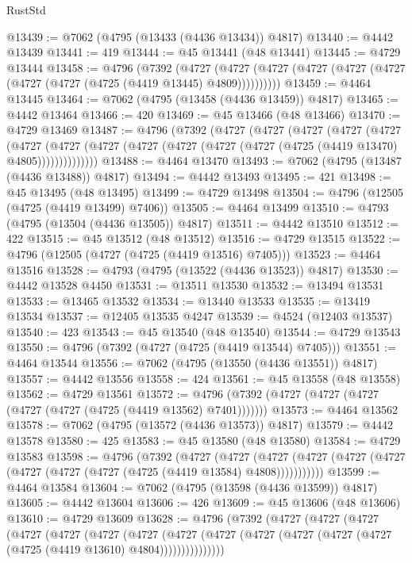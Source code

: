 \begin{lexlean}{RustStd}
\begin{coremodule}
@13439 := @7062 (@4795 (@13433 (@4436 @13434)) @4817)
@13440 := @4442 @13439
@13441 := 419
@13444 := @45 @13441 (@48 @13441)
@13445 := @4729 @13444
@13458 := @4796
    (@7392
      (@4727 (@4727 (@4727 (@4727 (@4727 (@4727 (@4727 (@4727 (@4725 (@4419 @13445) @4809))))))))))
@13459 := @4464 @13445
@13464 := @7062 (@4795 (@13458 (@4436 @13459)) @4817)
@13465 := @4442 @13464
@13466 := 420
@13469 := @45 @13466 (@48 @13466)
@13470 := @4729 @13469
@13487 := @4796
    (@7392
      (@4727
        (@4727
          (@4727
            (@4727
              (@4727
                (@4727
                  (@4727
                    (@4727 (@4727 (@4727 (@4727 (@4727 (@4725 (@4419 @13470) @4805))))))))))))))
@13488 := @4464 @13470
@13493 := @7062 (@4795 (@13487 (@4436 @13488)) @4817)
@13494 := @4442 @13493
@13495 := 421
@13498 := @45 @13495 (@48 @13495)
@13499 := @4729 @13498
@13504 := @4796 (@12505 (@4725 (@4419 @13499) @7406))
@13505 := @4464 @13499
@13510 := @4793 (@4795 (@13504 (@4436 @13505)) @4817)
@13511 := @4442 @13510
@13512 := 422
@13515 := @45 @13512 (@48 @13512)
@13516 := @4729 @13515
@13522 := @4796 (@12505 (@4727 (@4725 (@4419 @13516) @7405)))
@13523 := @4464 @13516
@13528 := @4793 (@4795 (@13522 (@4436 @13523)) @4817)
@13530 := @4442 @13528 @4450
@13531 := @13511 @13530
@13532 := @13494 @13531
@13533 := @13465 @13532
@13534 := @13440 @13533
@13535 := @13419 @13534
@13537 := @12405 @13535 @4247
@13539 := @4524 (@12403 @13537)
@13540 := 423
@13543 := @45 @13540 (@48 @13540)
@13544 := @4729 @13543
@13550 := @4796 (@7392 (@4727 (@4725 (@4419 @13544) @7405)))
@13551 := @4464 @13544
@13556 := @7062 (@4795 (@13550 (@4436 @13551)) @4817)
@13557 := @4442 @13556
@13558 := 424
@13561 := @45 @13558 (@48 @13558)
@13562 := @4729 @13561
@13572 := @4796 (@7392 (@4727 (@4727 (@4727 (@4727 (@4727 (@4725 (@4419 @13562) @7401)))))))
@13573 := @4464 @13562
@13578 := @7062 (@4795 (@13572 (@4436 @13573)) @4817)
@13579 := @4442 @13578
@13580 := 425
@13583 := @45 @13580 (@48 @13580)
@13584 := @4729 @13583
@13598 := @4796
    (@7392
      (@4727
        (@4727
          (@4727 (@4727 (@4727 (@4727 (@4727 (@4727 (@4727 (@4725 (@4419 @13584) @4808)))))))))))
@13599 := @4464 @13584
@13604 := @7062 (@4795 (@13598 (@4436 @13599)) @4817)
@13605 := @4442 @13604
@13606 := 426
@13609 := @45 @13606 (@48 @13606)
@13610 := @4729 @13609
@13628 := @4796
    (@7392
      (@4727
        (@4727
          (@4727
            (@4727
              (@4727
                (@4727
                  (@4727
                    (@4727
                      (@4727 (@4727 (@4727 (@4727 (@4727 (@4725 (@4419 @13610) @4804)))))))))))))))

\end{coremodule}
\end{lexlean}
